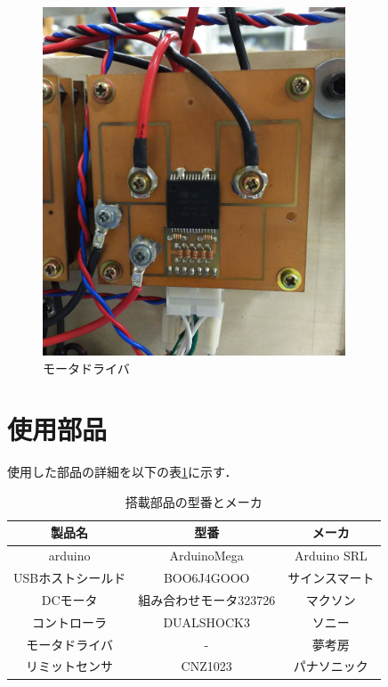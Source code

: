 \begin{figure}[!htbp]
  \begin{center}
    \includegraphics[width=90mm]{img/motordrive.JPG}
    \end{center}
  \caption{モータドライバ}
 \label{fig:motordrive}
\end{figure}

\section{使用部品}
使用した部品の詳細を以下の表\ref{tab:parts}に示す．

\begin{table}[!htb]
 \begin{center}
  \caption{搭載部品の型番とメーカ}
  \begin{tabular}[htbp]{|c|c|c|}
   \hline
   製品名&型番&メーカ \\
   \hline
   arduino&ArduinoMega&Arduino SRL\\
   \hline
   USBホストシールド&BOO6J4GOOO&サインスマート\\
   \hline
   DCモータ&組み合わせモータ323726&マクソン\\
   \hline
   コントローラ&DUALSHOCK3&ソニー\\
   \hline
   モータドライバ&-&夢考房\\
   \hline
   リミットセンサ&CNZ1023&パナソニック\\
   \hline
  \end{tabular}
  \label{tab:parts}
 \end{center}
\end{table}
